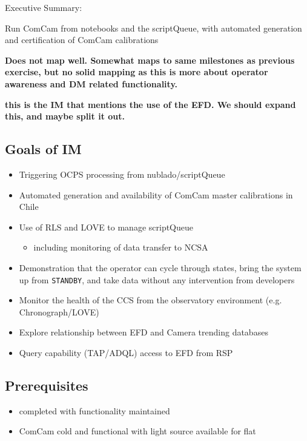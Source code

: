 
Executive Summary:

Run ComCam from notebooks and the scriptQueue, with automated generation and certification of ComCam calibrations

\textbf{Does not map well. Somewhat maps to same milestones as previous exercise, but no solid mapping as this is more about operator awareness and DM related functionality. }

\textbf{\Nb this is the IM that mentions the use of the EFD.  We should expand this, and maybe split it out.}

\subsection{Goals of IM}
\label{sec:org3154347}
\begin{itemize}
	\item Triggering \gls{OCPS} processing from nublado/scriptQueue
	\item Automated generation and availability of ComCam master calibrations in Chile
	\item Use of \gls{RLS} and \gls{LOVE} to manage scriptQueue
	\begin{itemize}
		\item including monitoring of data transfer to NCSA
	\end{itemize}
	\item Demonstration that the operator can cycle through states, bring
	the system up from \texttt{STANDBY}, and take data without any intervention from developers
	\item Monitor the health of the \gls{CCS} from the observatory environment (e.g. Chronograph/\gls{LOVE})
	\item Explore relationship between \gls{EFD} and Camera trending databases
	\item Query capability (TAP/ADQL) access to \gls{EFD} from \gls{RSP}
\end{itemize}

\subsection{Prerequisites}
\begin{itemize}
	\item{ completed with functionality maintained}
	\item{ComCam cold and functional with light source available for flat}
\end{itemize}


